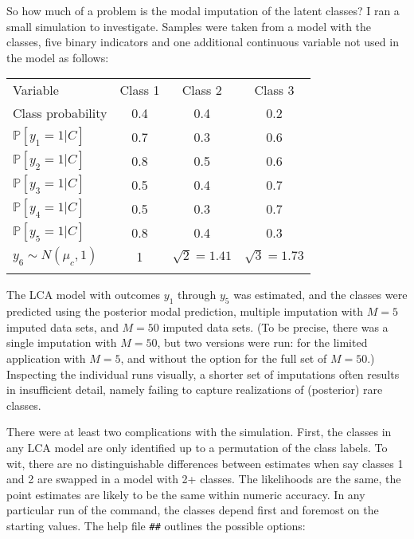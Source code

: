 So how much of a problem is the modal imputation of the latent classes?
I ran a small simulation to investigate. Samples were taken from
a model with the classes, five binary indicators and one additional 
continuous variable not used in the model as follows:

\begin{tabular}{l|ccc}
   \noalign{\smallskip}
  \hline
  \noalign{\smallskip}
  Variable & Class 1 & Class 2 & Class 3 \\
  \noalign{\smallskip}
  \hline
  \noalign{\smallskip}
  Class probability & 0.4 & 0.4 & 0.2 \\
  $\mathbb{P}[y_1=1|C]$ & 0.7 & 0.3 & 0.6 \\
  $\mathbb{P}[y_2=1|C]$ & 0.8 & 0.5 & 0.6 \\
  $\mathbb{P}[y_3=1|C]$ & 0.5 & 0.4 & 0.7 \\
  $\mathbb{P}[y_4=1|C]$ & 0.5 & 0.3 & 0.7 \\
  $\mathbb{P}[y_5=1|C]$ & 0.8 & 0.4 & 0.3 \\
  \noalign{\smallskip}
  \hline
  \noalign{\smallskip}  
  $y_6\sim N(\mu_c,1)$ & 1 & $\sqrt{2}=1.41$ & $\sqrt{3}=1.73$ \\
  \noalign{\smallskip}
  \hline
  \noalign{\smallskip}  
\end{tabular}

The LCA model with outcomes $y_1$ through $y_5$ was estimated,
and the classes were predicted using the posterior modal prediction,
multiple imputation with $M=5$ imputed data sets, and $M=50$ imputed 
data sets.
(To be precise, there was a single imputation with $M=50$, but 
two versions were run:  for the limited
application with $M=5$, and without the  option for the full
set of $M=50$.) Inspecting the individual runs visually, a shorter set
of imputations often results in insufficient detail, namely failing to 
capture realizations of (posterior) rare classes.

There were at least two complications with the simulation. 
First, the classes in any LCA model are only identified up to
a permutation of the class labels. 
To wit, there are no distinguishable differences between 
estimates when say classes 1 and 2 are swapped in a model with 2+ classes.
The likelihoods are the same, the point estimates are likely to be
the same within numeric accuracy.
In any particular run of the  command, 
the classes depend first and foremost on the starting values. 
The help file 
\verb|##|
outlines the possible options:

